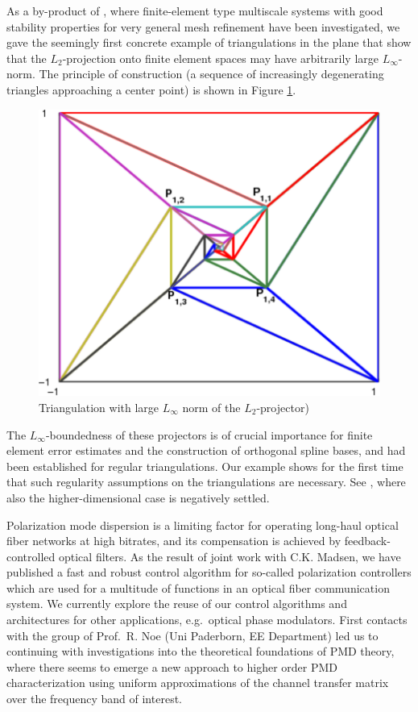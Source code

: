 As a by-product of
\cite{Oswald2006b}, where finite-element type
multiscale systems with good stability properties for very general
mesh refinement have been investigated, we gave the seemingly
first concrete example of triangulations in the plane that show
that the $L_2$-projection onto finite element spaces may have
arbitrarily large $L_\infty$-norm. The principle of construction 
(a sequence of increasingly degenerating triangles approaching a center point)
is shown in Figure \ref{fig:profOswald06}. 
\begin{figure}[ht]
  \begin{center}
    \includegraphics[width=\hsize]{Oswald/profOswald-fig1.png}
    \caption{Triangulation with large $L_\infty$ norm of the $L_2$-projector)}\label{fig:profOswald06}
   \end{center}
\end{figure}
The $L_\infty$-boundedness of
these projectors is of crucial importance for finite element error
estimates and the construction of orthogonal spline bases, and 
had been established for regular triangulations.
Our example shows for the first time that such regularity assumptions on the triangulations
are necessary. See \cite{Oswald2007a}, where also the higher-dimensional case
is negatively settled.

Polarization mode dispersion is a limiting factor for
operating long-haul optical fiber networks at high bitrates, and
its compensation is achieved by feedback-controlled
optical filters. As the result of joint work with
C.K. Madsen, we have published 
a fast and robust control algorithm for so-called
polarization controllers \cite{Oswald2006a}
which are used for a multitude of functions in an optical
fiber communication system. We currently explore the reuse 
of our control algorithms and architectures for other applications,
e.g.\ optical phase modulators. First contacts with the group
of Prof.~R. Noe (Uni Paderborn, EE Department)
led us to continuing with investigations into the theoretical
foundations of PMD theory, where there seems to emerge a new 
approach to higher order PMD characterization using uniform
approximations of the channel transfer matrix over the frequency band
of interest. 

